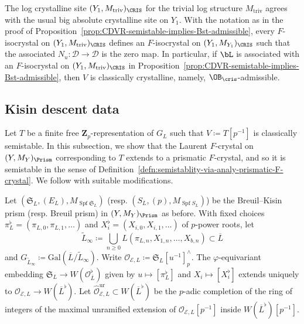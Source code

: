 \begin{rem}
The log crystalline site $(Y_1, M_\mathrm{triv})_\CRIS$ for the trivial log structure $M_\mathrm{triv}$ agrees with the usual big absolute crystalline site on $Y_1$.  With the notation as in the proof of Proposition~\ref{prop:CDVR-semistable-implies-Bst-admissible}, every $F$-isocrystal on $(Y_1, M_\mathrm{triv})_\CRIS$ defines an $F$-isocrystal on $(Y_1, M_{Y_1})_\CRIS$ such that the associated $N_u\colon \mathscr{D}\rightarrow\mathscr{D}$ is the zero map. In particular, if $\bL$ is associated with an $F$-isocrystal on $(Y_1, M_\mathrm{triv})_\CRIS$ in Proposition~\ref{prop:CDVR-semistable-implies-Bst-admissible}, then $V$ is classically crystalline, namely, $\OB_\cris$-admissible.
\end{rem}



\subsection{Kisin descent data} \label{sec:quasi Kisin module and rational descent data} 

Let $T$ be a finite free $\mathbf{Z}_p$-representation of $G_L$ such that $V \coloneqq T[p^{-1}]$ is classically semistable. In this subsection, we show that the Laurent $F$-crystal on $(Y, M_Y)_{\Prism}$ corresponding to $T$ extends to a prismatic $F$-crystal, and so it is semistable in the sense of Definition~\ref{defn:semistablity-via-analy-prismatic-F-crystal}. We follow \cite[\S4]{du-liu-moon-shimizu-completed-prismatic-F-crystal-loc-system} with suitable modifications.

Let $(\mathfrak{S}_L, (E_L), M_{\operatorname{Spf}\mathfrak{S}_L})$ (resp. $(S_L, (p), M_{\operatorname{Spf}S_L})$) be the Breuil--Kisin prism (resp. Breuil prism) in $(Y, M_Y)_{\Prism}$ as before. With fixed choices $\pi_L^{\flat} = (\pi_{L, 0}, \pi_{L, 1}, \ldots)$ and  $X_i^{\flat} = (X_{i, 0}, X_{i, 1}, \ldots)$ of $p$-power roots, let
\[
\widetilde{L}_{\infty} \coloneqq \bigcup_{n \geq 0} L(\pi_{L,n}, X_{1, n}, \ldots, X_{b, n}) \subset \overline{L}
\]
and $G_{\widetilde{L}_{\infty}} \coloneqq \mathrm{Gal}(\overline{L} / \widetilde{L}_{\infty})$. Write $\mathcal{O}_{\mathcal{E}, L} \coloneqq \mathfrak{S}_L[u^{-1}]^{\wedge}_p$. The $\varphi$-equivariant embedding $\mathfrak{S}_L \rightarrow W(\mathcal{O}_{\overline{L}}^{\flat})$ given by $u \mapsto [\pi_L^{\flat}]$ and $X_i \mapsto [X_i^{\flat}]$ extends uniquely to $\mathcal{O}_{\mathcal{E}, L} \rightarrow W(\overline{L}^{\flat})$. Let $\widehat{\mathcal{O}}_{\mathcal{E}, L}^{\mathrm{ur}} \subset W(\overline{L}^{\flat})$ be the $p$-adic completion of the ring of integers of the maximal unramified extension of $\mathcal{O}_{\mathcal{E}, L}[p^{-1}]$ inside $W(\overline{L}^{\flat})[p^{-1}]$. 

